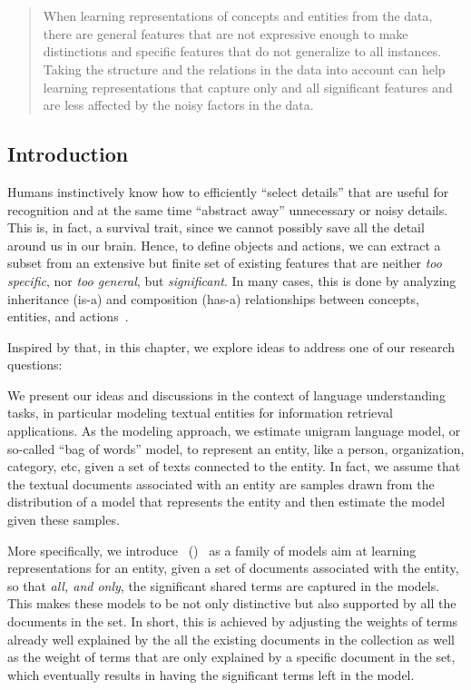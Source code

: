 \chapter{}
\label{chap:2}
%
\begin{quote}
When learning representations of concepts and entities from the data, there are general features that are not expressive enough to make distinctions and specific features that do not generalize to all instances. Taking the structure and the relations in the data into account can help learning representations that capture only and all significant features and are less affected by the noisy factors in the data.
\end{quote}
%
\section{Introduction}
Humans instinctively know how to efficiently ``select details'' that are useful for recognition and at the same time ``abstract away'' unnecessary or noisy details.~\cite{tenenbaum2011grow, gentner1997structure, battaglia2018relational} 
This is, in fact, a survival trait, since we cannot possibly save all the detail around us in our brain. Hence, to define objects and actions, we can extract a subset from an extensive but finite set of existing features that are neither \emph{too specific}, nor \emph{too general}, but \emph{significant}. In many cases, this is done by analyzing inheritance (is-a) and composition (has-a) relationships between concepts, entities, and actions~\citep{goodwin2005reasoning, botvinick2008hierarchical}. 

Inspired by that, in this chapter, we explore ideas to address one of our research questions:

We present our ideas and discussions in the context of language understanding tasks, in particular modeling textual entities for information retrieval applications. As the modeling approach, we estimate unigram language model, or so-called  ``bag of words'' model, to represent an entity, like a person, organization, category, etc, given a set of texts connected to the entity.  In fact, we assume that the textual documents associated with an entity are samples drawn from the distribution of a model that represents the entity and then estimate the model given these samples.

More specifically, we introduce \textsl{\swlms}\ (\acswlm)~\cite{Dehghani:CIKM2016:long, Dehghani:2016:CHIIR, Dehghani2016:trec} as a family of models aim at learning representations for an entity, given a set of documents associated with the entity, so that \emph{all, and only}, the significant shared terms are captured in the models. This makes these models to be not only distinctive but also supported by all the documents in the set. In short, this is achieved by adjusting the weights of terms already well explained by the all the existing documents in the collection as well as the weight of terms that are only explained by a specific document in the set, which eventually results in having the significant terms left in the model. 


